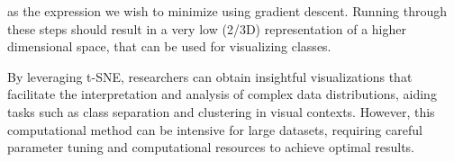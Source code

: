 as the expression we wish to minimize using gradient descent.
Running through these steps should result in a very low (2/3D) representation of a higher dimensional space, that can be used for visualizing classes.

By leveraging t-SNE, researchers can obtain insightful visualizations that facilitate the interpretation and analysis of complex data distributions, aiding tasks such as class separation and clustering in visual contexts. However, this computational method can be intensive for large datasets, requiring careful parameter tuning and computational resources to achieve optimal results.
